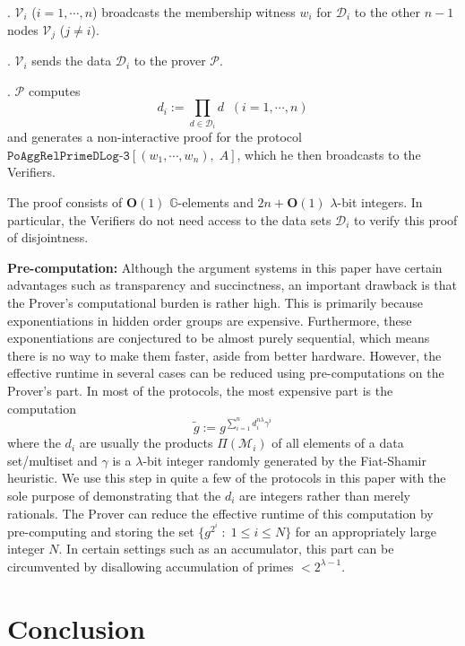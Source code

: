 \documentclass[11pt, lettersize, notitlepage, leqno, footskip=0.6cm]{article}
\newcommand{\pl}{\prod\limits}
\newcommand{\slim}{\sum\limits}
\newcommand{\ttt}{\texttt}
\newcommand{\bG}{\mathbb{G}}
\newcommand{\wti}{\widetilde}
\newcommand{\mc}{\mathcal}
\newcommand{\mbf}{\mathbf}
\newcommand{\lam}{\lambda}
\newcommand{\bO}{\mbf{O}}
\newcommand{\mP}{\mc{P}}
\newcommand{\V}{\mc{V}}
\newcommand{\mcM}{\mc{M}}
\newcommand{\vs}{\vspace{-0.15cm}}
\newcommand{\noin}{\noindent}
\numberwithin{equation}{section}
\begin{document}
\noin 1. $\V_i$ ($i=1,\cdots,n$) broadcasts the membership witness $w_i$ for $\mc{D}_i$ to the other $n-1$ nodes $\V_j$ ($j\neq i$). 

\noin 2. $\V_i$ sends the data $\mc{D}_i$ to the prover $\mP$.

\noin 3. $\mP$ computes \vs $$d_i:= \pl_{d\in\mc{D}_i} d\;\;(i=1,\cdots,n)$$ and generates a non-interactive proof for the protocol \hyperlink{RP3}{$\ttt{PoAggRelPrimeDLog-3}[(w_1,\cdots,w_n),\; A]$}, which he then broadcasts to the Verifiers.

The proof consists of $\bO(1)$ $\bG$-elements and $2n+\bO(1)$ $\lam$-bit integers. In particular, the Verifiers do not need access to the data sets $\mc{D}_i$ to verify this proof of disjointness.




\bigskip

\noin \textbf{Pre-computation:} Although the argument systems in this paper have certain advantages such as transparency and succinctness, an important drawback is that the Prover's computational burden is rather high. This is primarily because exponentiations in hidden order groups are expensive. Furthermore, these exponentiations are conjectured to be almost purely sequential, which means there is no way to make them faster, aside from better hardware. However, the effective runtime in several cases can be reduced using pre-computations on the Prover's part. In most of the protocols, the most expensive part is the computation \vs $$\wti{g}:= g^{\slim_{i=1}^n d_i^{n\lam}\gamma^i}$$ where the $d_i$ are usually the products $\Pi(\mcM_i)$ of all elements of a data set/multiset and $\gamma$ is a $\lam$-bit integer randomly generated by the Fiat-Shamir heuristic. We use this step in quite a few of the protocols in this paper with the sole purpose of demonstrating that the $d_i$ are integers rather than merely rationals. The Prover can reduce the effective runtime of this computation by pre-computing and storing the set $\{g^{2^{i}}\;:\; 1\leq i\leq N \} $ for an appropriately large integer $N$. In certain settings such as an accumulator, this part can be circumvented by disallowing accumulation of primes $< 2^{\lam-1}$.



\section{\fontsize{12}{12}\selectfont Conclusion}
\end{document}
